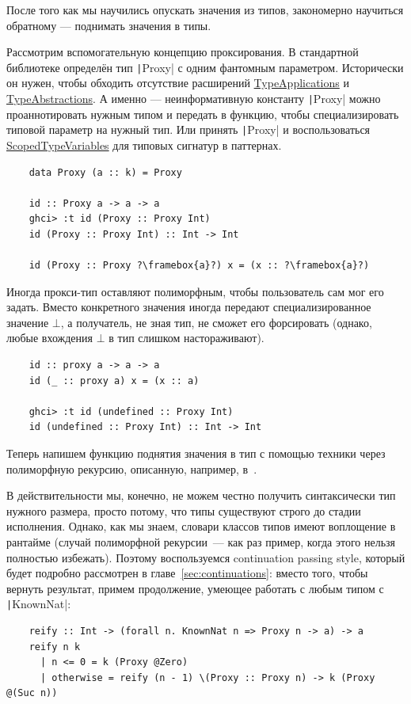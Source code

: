 После того как мы научились опускать значения из типов, закономерно научиться обратному --- поднимать значения в типы.

Рассмотрим вспомогательную концепцию проксирования.
В стандартной библиотеке определён тип \texttt|Proxy| с одним фантомным параметром.
Исторически он нужен, чтобы обходить отсутствие расширений \href{https://downloads.haskell.org/ghc/latest/docs/users_guide/exts/type_applications.html#extension-TypeApplications}{TypeApplications} и \href{https://downloads.haskell.org/ghc/latest/docs/users_guide/exts/type_abstractions.html#extension-TypeAbstractions}{TypeAbstractions}.
А именно --- неинформативную константу \texttt|Proxy| можно проаннотировать нужным типом и передать в функцию, чтобы специализировать типовой параметр на нужный тип.
Или принять \texttt|Proxy| и воспользоваться \href{https://downloads.haskell.org/ghc/latest/docs/users_guide/exts/scoped_type_variables.html#pattern-type-signatures}{ScopedTypeVariables} для типовых сигнатур в паттернах.
\begin{verbatim}
    data Proxy (a :: k) = Proxy

    id :: Proxy a -> a -> a
    ghci> :t id (Proxy :: Proxy Int)
    id (Proxy :: Proxy Int) :: Int -> Int

    id (Proxy :: Proxy ?\framebox{a}?) x = (x :: ?\framebox{a}?)
\end{verbatim}

Иногда прокси-тип оставляют полиморфным, чтобы пользователь сам мог его задать.
Вместо конкретного значения иногда передают специализированное значение $\bot$, а получатель, не зная тип, не сможет его форсировать (однако, любые вхождения $\bot$ в тип слишком настораживают).
\begin{verbatim}
    id :: proxy a -> a -> a
    id (_ :: proxy a) x = (x :: a)

    ghci> :t id (undefined :: Proxy Int)
    id (undefined :: Proxy Int) :: Int -> Int
\end{verbatim}

Теперь напишем функцию поднятия значения в тип с помощью техники через полиморфную рекурсию, описанную, например, в~\cite{kiselyov2004functional}.

В действительности мы, конечно, не можем честно получить синтаксически тип нужного размера, просто потому, что типы существуют строго до стадии исполнения.
Однако, как мы знаем, словари классов типов имеют воплощение в рантайме (случай полиморфной рекурсии~--- как раз пример, когда этого нельзя полностью избежать).
Поэтому воспользуемся continuation passing style, который будет подробно рассмотрен в главе~\ref{sec:continuations}: вместо того, чтобы вернуть результат, примем продолжение, умеющее работать с любым типом с \texttt|KnownNat|:
\begin{verbatim}
    reify :: Int -> (forall n. KnownNat n => Proxy n -> a) -> a
    reify n k
      | n <= 0 = k (Proxy @Zero)
      | otherwise = reify (n - 1) \(Proxy :: Proxy n) -> k (Proxy @(Suc n))
\end{verbatim}

